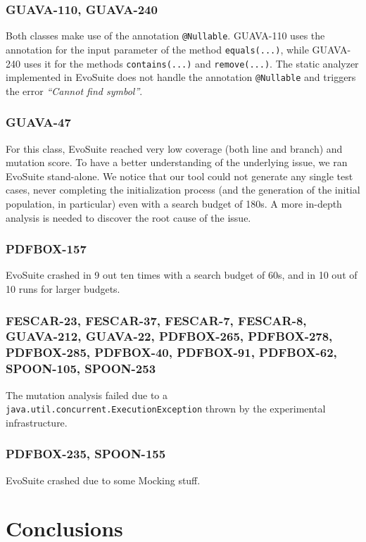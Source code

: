 \documentclass[sigconf]{acmart}
\newcommand{\EVOSUITE}{{\sc EvoSuite}\xspace}
\begin{document}

\subsubsection*{GUAVA-110, GUAVA-240} Both classes make use of the annotation \texttt{@Nullable}. GUAVA-110 uses the annotation for the input parameter of the method \texttt{equals(...)}, while GUAVA-240 uses it for the methods \texttt{contains(...)} and \texttt{remove(...)}. The static analyzer implemented in \EVOSUITE does not handle the annotation \texttt{@Nullable} and triggers the error \textit{``Cannot find symbol''}. 

\subsubsection*{GUAVA-47} For this class, \EVOSUITE reached very low coverage (both line and branch) and mutation score. To have a better understanding of the underlying issue, we ran \EVOSUITE stand-alone. We notice that our tool could not generate any single test cases, never completing the initialization process (and the generation of the initial population, in particular) even with a search budget of 180s. A more in-depth analysis is needed to discover the root cause of the issue.  

\subsubsection*{PDFBOX-157} \EVOSUITE crashed in 9 out ten times with a search budget of 60s, and in 10 out of 10 runs for larger budgets. 


\subsubsection*{FESCAR-23, FESCAR-37, FESCAR-7, FESCAR-8, GUAVA-212, GUAVA-22, PDFBOX-265, PDFBOX-278, PDFBOX-285, PDFBOX-40, PDFBOX-91, PDFBOX-62, SPOON-105, SPOON-253} The mutation analysis
failed due to a \texttt{java.util.concurrent.ExecutionException} thrown by the
experimental infrastructure.


\subsubsection*{PDFBOX-235, SPOON-155} \EVOSUITE crashed due to some Mocking stuff.


\section{Conclusions}



\end{document}
